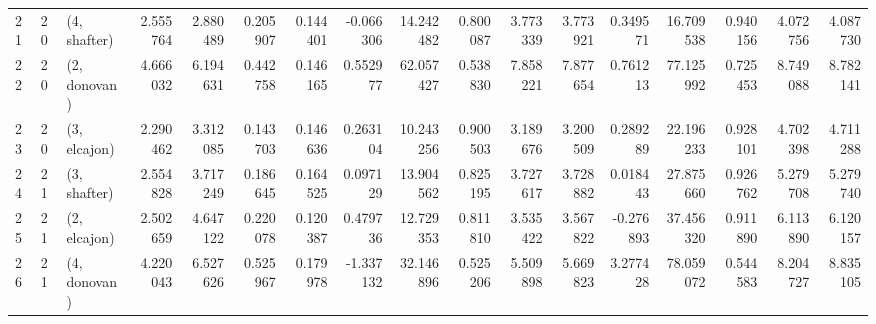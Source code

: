 \begin{tabular}{lllrrrrrrrrrrrrrr}
21 &    20 &  (4, shafter) &  2.555764 &  2.880489 &   0.205907 &  0.144401 & -0.066306 &  14.242482 &  0.800087 &   3.773339 &  3.773921 &  0.349571 &   16.709538 &  0.940156 &   4.072756 &   4.087730 \\
22 &    20 &  (2, donovan) &  4.666032 &  6.194631 &   0.442758 &  0.146165 &  0.552977 &  62.057427 &  0.538830 &   7.858221 &  7.877654 &  0.761213 &   77.125992 &  0.725453 &   8.749088 &   8.782141 \\
23 &    20 &  (3, elcajon) &  2.290462 &  3.312085 &   0.143703 &  0.146636 &  0.263104 &  10.243256 &  0.900503 &   3.189676 &  3.200509 &  0.289289 &   22.196233 &  0.928101 &   4.702398 &   4.711288 \\
24 &    21 &  (3, shafter) &  2.554828 &  3.717249 &   0.186645 &  0.164525 &  0.097129 &  13.904562 &  0.825195 &   3.727617 &  3.728882 &  0.018443 &   27.875660 &  0.926762 &   5.279708 &   5.279740 \\
25 &    21 &  (2, elcajon) &  2.502659 &  4.647122 &   0.220078 &  0.120387 &  0.479736 &  12.729353 &  0.811810 &   3.535422 &  3.567822 & -0.276893 &   37.456320 &  0.911890 &   6.113890 &   6.120157 \\
26 &    21 &  (4, donovan) &  4.220043 &  6.527626 &   0.525967 &  0.179978 & -1.337132 &  32.146896 &  0.525206 &   5.509898 &  5.669823 &  3.277428 &   78.059072 &  0.544583 &   8.204727 &   8.835105 \\
\bottomrule
\end{tabular}
